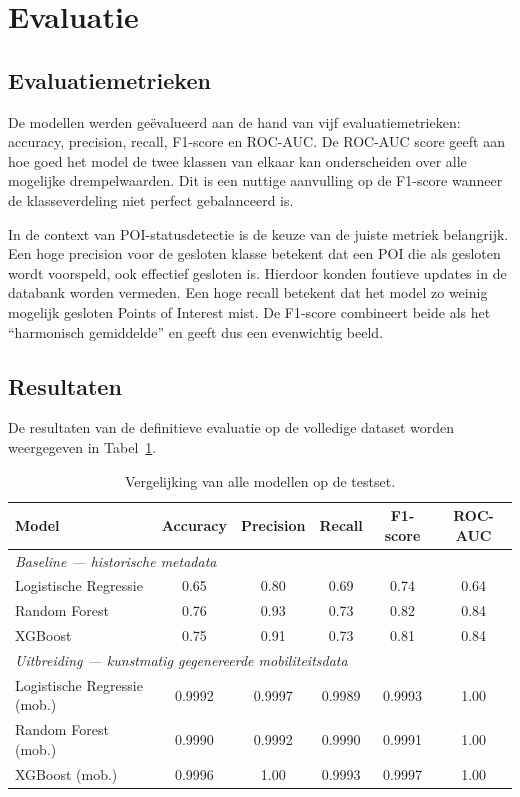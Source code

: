 \section{Evaluatie}

\subsection{Evaluatiemetrieken}
De modellen werden geëvalueerd aan de hand van vijf evaluatiemetrieken: accuracy, precision, recall, F1-score en ROC-AUC. De ROC-AUC score geeft aan hoe goed het model de twee klassen van elkaar kan onderscheiden over alle mogelijke drempelwaarden. Dit is een nuttige aanvulling op de F1-score wanneer de klasseverdeling niet perfect gebalanceerd is.

In de context van POI-statusdetectie is de keuze van de juiste metriek belangrijk. Een hoge precision voor de gesloten klasse betekent dat een POI die als gesloten wordt voorspeld, ook effectief gesloten is. Hierdoor konden  foutieve updates in de databank worden vermeden. Een hoge recall betekent dat het model zo weinig mogelijk gesloten Points of Interest mist. De F1-score combineert beide als het “harmonisch gemiddelde” en geeft dus een evenwichtig beeld.

\subsection{Resultaten}
De resultaten van de definitieve evaluatie op de volledige dataset worden weergegeven in Tabel~\ref{tab:resultaten}.

\begin{table}[H]
    \centering
    \small
    \begin{tabular}{lccccc}
        \toprule
        \textbf{Model} & \textbf{Accuracy} & \textbf{Precision} & \textbf{Recall} & \textbf{F1-score} & \textbf{ROC-AUC} \\
        \midrule
        \multicolumn{6}{l}{\textit{Baseline — historische metadata}} \\
        \midrule
        Logistische Regressie  & 0.65 & 0.80 & 0.69 & 0.74 & 0.64 \\
        Random Forest          & 0.76 & 0.93 & 0.73 & 0.82 & 0.84 \\
        XGBoost                & 0.75 & 0.91 & 0.73 & 0.81 & 0.84 \\
        \midrule
        \multicolumn{6}{l}{\textit{Uitbreiding — kunstmatig gegenereerde mobiliteitsdata}} \\
        \midrule
        Logistische Regressie (mob.) & 0.9992 & 0.9997 & 0.9989 & 0.9993 & 1.00 \\
        Random Forest (mob.)         & 0.9990 & 0.9992 & 0.9990 & 0.9991 & 1.00 \\
        XGBoost (mob.)               & 0.9996 & 1.00   & 0.9993 & 0.9997 & 1.00 \\
        \bottomrule
    \end{tabular}
    \caption[Vergelijking van modelresultaten]{%
        \label{tab:resultaten}Vergelijking van alle modellen op de testset.}
\end{table}

